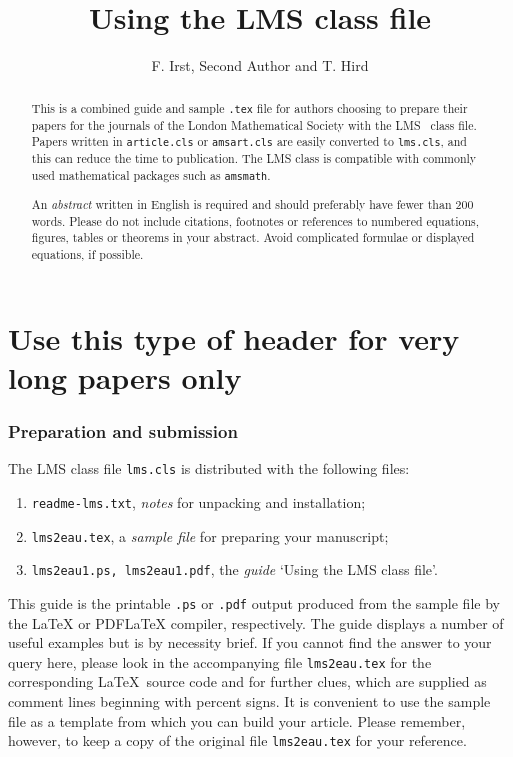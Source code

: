 \documentclass{lms}
\title[Title abbreviated to max 50 characters goes here]%
 {Using the LMS class file} %
\author{F. Irst, Second Author and T. Hird}
\begin{document}
\maketitle

\begin{abstract}
This is a combined guide and sample {\tt .tex} file for authors
choosing to prepare their papers for the journals of the London
Mathematical Society with the LMS \LaTeXe\ class file. Papers
written in {\tt article.cls} or {\tt amsart.cls} are easily
converted to {\tt lms.cls}, and this can reduce the time to
publication. The LMS class is compatible with commonly used
mathematical packages such as {\tt amsmath}.

An \emph{abstract} written in English is
required and should preferably have fewer than 200 words.
Please do not include citations, footnotes or references
to numbered equations, figures, tables or theorems in your
abstract. Avoid complicated formulae or displayed equations, if
possible.
\end{abstract}

\part{Use this type of header for very long papers only}

\section{Preparation and submission} %
\label{intro}

\noindent The LMS class file {\tt lms.cls} is distributed with the
following files:
\begin{enumerate}[3]%
\item {\tt readme-lms.txt}, {\em notes\/} for unpacking and
      installation;
\item {\tt lms2eau.tex}, a {\em sample file\/} for preparing your
      manuscript;
\item {\tt lms2eau1.ps, lms2eau1.pdf}, the {\em guide\/} `Using
the LMS class file'.
\end{enumerate}
This guide is the printable {\tt .ps} or {\tt .pdf} output
produced from the sample file by the LaTeX or PDFLaTeX compiler,
respectively. The guide displays a number of useful examples but
is by necessity brief. If you cannot find the answer to your query
here, please look in the accompanying file {\tt lms2eau.tex} for
the corresponding \LaTeX\ source code and for further clues, which
are supplied as comment lines beginning with percent signs. It is
convenient to use the sample file as a template from which you can
build your article. Please remember, however, to keep a copy of
the original file {\tt lms2eau.tex} for your reference.
\end{document}

